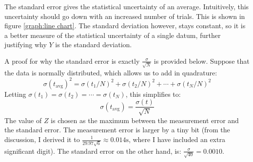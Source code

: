 \documentclass[%
 reprint,
 amsmath,amssymb,
 aps,
]{revtex4-2}
\begin{document}
The standard error gives the statistical uncertainty of an average. Intuitively, this uncertainty should go down with an increased number of trials. This is shown in figure \ref{graph:line chart}. The standard deviation however, stays constant, so it is a better measure of the statistical uncertainty of a single datum, further justifying why $Y$ is the standard deviation.

A proof for why the standard error is exactly $\frac{\sigma}{\sqrt{N}}$ is provided below. Suppose that the data is normally distributed, which allows us to add in quadrature:
\begin{equation}
    \sigma(t_\text{avg})^2=\sigma(t_1/N)^2+\sigma(t_2/N)^2+\cdots+\sigma(t_N/N)^2
    \label{eq:}
\end{equation}
Letting $\sigma(t_1) = \sigma(t_2) = \cdots = \sigma(t_N)$, this simplifies to:
\begin{equation}
    \sigma (t_\text{avg}) = \frac{\sigma (t)}{\sqrt{N}}
    \label{eq:}
\end{equation}
The value of $Z$ is chosen as the maximum between the measurement error and the standard error. The measurement error is larger by a tiny bit (from the discussion, I derived it to $\frac{1}{29.97\sqrt{6}}\approx 0.014 \si{\second}$, where I have included an extra significant digit). The standard error on the other hand, is: $\frac{\sigma}{\sqrt{40}}=0.0010$.
\end{document}
